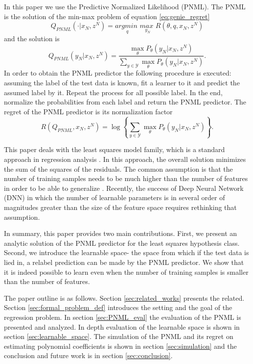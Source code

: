\documentclass[conference,letterpaper]{IEEEtran}
\def\pnmlSingle{\max_{\theta} P_\theta (y_N|x_N, z^N)}
\begin{document}
In this paper we use the Predictive Normalized Likelihood (PNML). The PNML is the solution of the min-max problem of equation \ref{eq:genie_regret} \cite{shtar1987universal}
\begin{equation} \label{eq:minmax_prob}
Q_{\textit{PNML}}(\cdot|x_N,z^N) = \underset{q}{\textit{argmin }}\underset{y_N}{\textit{max }} R(\theta, q, x_N, z^N)
\end{equation}
and the solution is 
\begin{equation} \label{eq:pnml}
Q_{PNML}(y_N|x_N,z^N)=\frac{\pnmlSingle}{\sum_{y\in \mathcal{Y}} \pnmlSingle}.
\end{equation}
In order to obtain the PNML predictor the following procedure is executed:  assuming the label of the test data is known, fit a learner to it and predict the assumed label by it. 
Repeat the process for all possible label. 
In the end, normalize the probabilities from each label and return the PNML predictor.
The regret of the PNML predictor is its normalization factor
\begin{equation} \label{eq:pnml_regret}
R(Q_{\textit{PNML}}, x_N, z^N) = \log \left\{ \sum_{y\in \mathcal{Y}} \pnmlSingle \right\}.
\end{equation}

This paper deals with the least squares model family, which is a standard approach in regression analysis \cite{lawson1995solving}. 
In this approach, the overall solution minimizes the sum of the squares of the residuals. The common assumption is that the number of training samples needs to be much higher than the number of features in order to be able to generalize \cite{james2013introduction}.
Recently, the success of Deep Neural Network (DNN) in which the number of learnable parameters is in several order of magnitudes greater than the size of the feature space requires rethinking that assumption.

In summary, this paper provides two main contributions.
First, we present an analytic solution of the PNML predictor for the least squares hypothesis class. Second, we introduce the learnable space- the space from which if the test data is lied in, a relabel prediction can be made by the PNML predictor. We show that it is indeed possible to learn even when the number of training samples is smaller than the number of features.

The paper outline is as follows.
Section \ref{sec:related_works} presents the related. Section \ref{sec:formal_problem_def} introduces the setting and the goal of the regression problem. In section \ref{sec:PNML_eval} the evaluation of the PNML is presented and analyzed. In depth evaluation of the learnable space is shown in section \ref{sec:learnable_space}. The simulation of the PNML and its regret on estimating polynomial coefficients is shown in section \ref{sec:simulation} and the conclusion and future work is in section \ref{sec:conclusion}.
\end{document}
